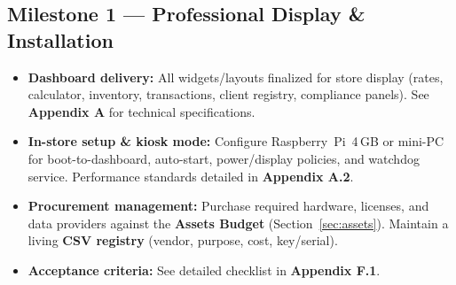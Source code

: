 \documentclass[11pt, a4paper]{article}
\begin{document}
\subsection{Milestone 1 — Professional Display \& Installation}
\begin{itemize}[leftmargin=*]
  \item \textbf{Dashboard delivery:} All widgets/layouts finalized for store display (rates, calculator, inventory, transactions, client registry, compliance panels). See \textbf{Appendix A} for technical specifications.
  \item \textbf{In-store setup \& kiosk mode:} Configure Raspberry~Pi~4\,GB or mini-PC for boot-to-dashboard, auto-start, power/display policies, and watchdog service. Performance standards detailed in \textbf{Appendix A.2}.
  \item \textbf{Procurement management:} Purchase required hardware, licenses, and data providers against the \textbf{Assets Budget} (Section~\ref{sec:assets}). Maintain a living \textbf{CSV registry} (vendor, purpose, cost, key/serial).
  \item \textbf{Acceptance criteria:} See detailed checklist in \textbf{Appendix F.1}.
\end{itemize}
\end{document}
